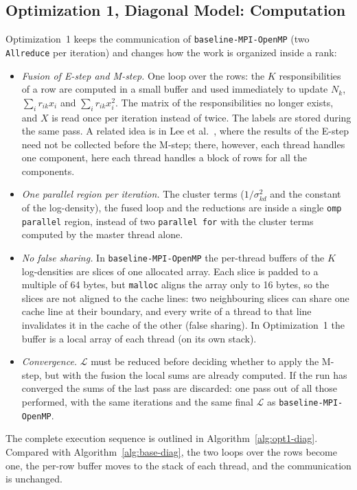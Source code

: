 \documentclass[conference,onecolumn]{IEEEtran}
\newcommand{\vbase}{\texttt{baseline-\allowbreak MPI-\allowbreak OpenMP}}
\begin{document}
\subsection{Optimization 1, Diagonal Model: Computation}
Optimization~1 keeps the communication of \vbase{} (two \texttt{Allreduce} per iteration) and changes how the work is organized inside a rank:
\begin{itemize}
\item \emph{Fusion of E-step and M-step.} One loop over the rows: the $K$ responsibilities of a row are computed in a small buffer and used immediately to update $N_k$, $\sum_i r_{ik}x_i$ and $\sum_i r_{ik}x_i^2$. The matrix of the responsibilities no longer exists, and $X$ is read once per iteration instead of twice. The labels are stored during the same pass. A related idea is in Lee et al.~\cite[Sec.~4.3]{lee2016}, where the results of the E-step need not be collected before the M-step; there, however, each thread handles one component, here each thread handles a block of rows for all the components.
\item \emph{One parallel region per iteration.} The cluster terms ($1/\sigma^2_{kd}$ and the constant of the log-density), the fused loop and the reductions are inside a single \texttt{omp parallel} region, instead of two \texttt{parallel for} with the cluster terms computed by the master thread alone.
\item \emph{No false sharing.} In \vbase{} the per-thread buffers of the $K$ log-densities are slices of one allocated array. Each slice is padded to a multiple of 64 bytes, but \texttt{malloc} aligns the array only to 16 bytes, so the slices are not aligned to the cache lines: two neighbouring slices can share one cache line at their boundary, and every write of a thread to that line invalidates it in the cache of the other (false sharing). In Optimization~1 the buffer is a local array of each thread (on its own stack).
\item \emph{Convergence.} $\mathcal{L}$ must be reduced before deciding whether to apply the M-step, but with the fusion the local sums are already computed. If the run has converged the sums of the last pass are discarded: one pass out of all those performed, with the same iterations and the same final $\mathcal{L}$ as \vbase{}.
\end{itemize}
The complete execution sequence is outlined in Algorithm~\ref{alg:opt1-diag}. Compared with Algorithm~\ref{alg:base-diag}, the two loops over the rows become one, the per-row buffer moves to the stack of each thread, and the communication is unchanged.
\end{document}
